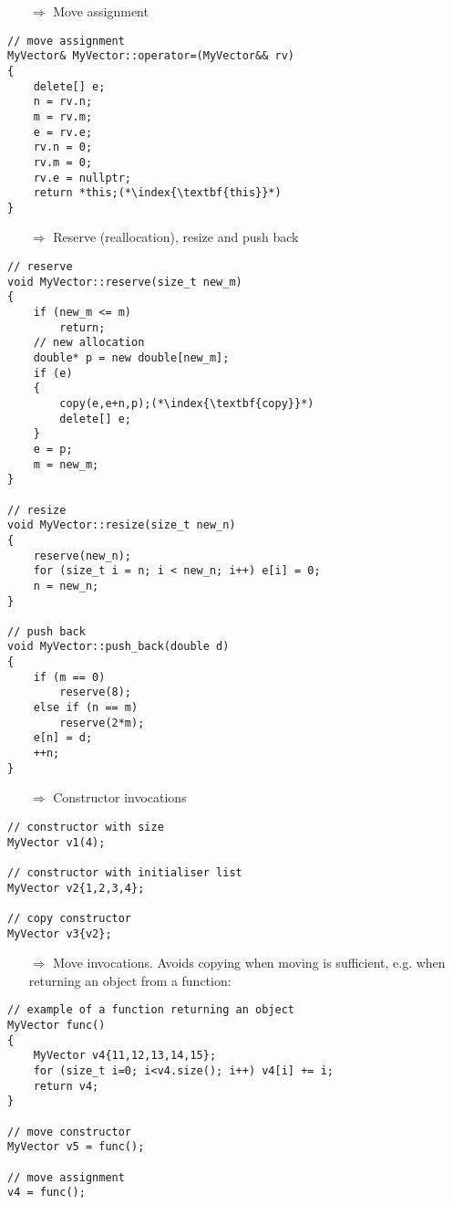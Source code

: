 \documentclass[10pt]{article}
\begin{document}
\begin{enumerate}
\item[$\Rightarrow$] Move assignment
\end{enumerate}
\begin{lstlisting}
// move assignment
MyVector& MyVector::operator=(MyVector&& rv)
{
    delete[] e;
    n = rv.n;
    m = rv.m;
    e = rv.e;
    rv.n = 0;
    rv.m = 0;
    rv.e = nullptr;
    return *this;(*\index{\textbf{this}}*)
}
\end{lstlisting}
\begin{enumerate}
\item[$\Rightarrow$] Reserve (reallocation), resize and push back
\end{enumerate}
\begin{lstlisting}
// reserve
void MyVector::reserve(size_t new_m)
{
    if (new_m <= m)
        return;
    // new allocation
    double* p = new double[new_m];
    if (e)
    {
        copy(e,e+n,p);(*\index{\textbf{copy}}*)
        delete[] e;
    }
    e = p;
    m = new_m;
}

// resize
void MyVector::resize(size_t new_n)
{
    reserve(new_n);
    for (size_t i = n; i < new_n; i++) e[i] = 0;
    n = new_n;
}

// push back
void MyVector::push_back(double d)
{
    if (m == 0)
        reserve(8);
    else if (n == m)
        reserve(2*m);
    e[n] = d;
    ++n;
}
\end{lstlisting}
\begin{enumerate}
\item[$\Rightarrow$] Constructor invocations
\end{enumerate}
\begin{lstlisting}
// constructor with size
MyVector v1(4); 

// constructor with initialiser list
MyVector v2{1,2,3,4}; 

// copy constructor
MyVector v3{v2}; 
\end{lstlisting}
\begin{enumerate}
\item[$\Rightarrow$] Move invocations. Avoids copying when moving is sufficient, e.g. when returning an object from a function:
\end{enumerate}
\begin{lstlisting}
// example of a function returning an object
MyVector func()
{
    MyVector v4{11,12,13,14,15};
    for (size_t i=0; i<v4.size(); i++) v4[i] += i;
    return v4;
}

// move constructor
MyVector v5 = func(); 

// move assignment
v4 = func();       
\end{lstlisting}
%
%
\end{document}
